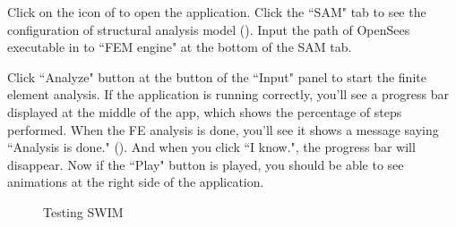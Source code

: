 

Click on the  icon of  \texttt{\getsoftwarename{}} to open the application.
Click the ``SAM" tab to see the configuration of structural analysis model (). 
Input the path of OpenSees executable in to ``FEM engine" at the bottom of the SAM tab.



Click ``Analyze" button at the button of the ``Input" panel to start the finite element analysis.
If the application is running correctly, you'll see a progress bar displayed at the middle of the app, which shows the percentage of steps performed. 
When the FE analysis is done, you'll see it shows a message saying ``Analysis is done."  ().
And when you click ``I know.", the progress bar will disappear. Now if the ``Play" button is played, you should be able to see animations at the right side of the application.

\begin{figure}[!htbp]
  \caption{Testing SWIM}
  \label{fig:testing}
\end{figure}


